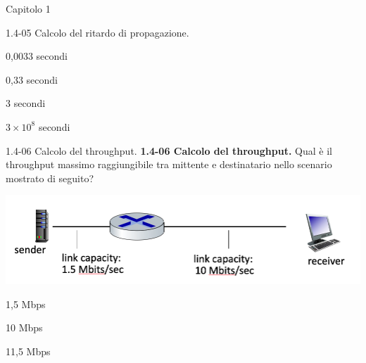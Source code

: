 \documentclass[a4paper]{article}
\begin{document}
\begin{quiz}{Capitolo 1}
\begin{multi}[points=1,shuffle=true]{1.4-05 Calcolo del ritardo di propagazione.}
\item* 0,0033 secondi
\item 0,33 secondi
\item 3 secondi
\item $3\times10^8$ secondi
\end{multi}

\begin{multi}[points=1,shuffle=true]{1.4-06 Calcolo del throughput.}
\textbf{1.4-06 Calcolo del throughput.} 
Qual è il throughput massimo raggiungibile tra mittente e destinatario nello scenario mostrato di seguito? 
\begin{center}
\includegraphics[width=.9\linewidth]{figs/1.4.6.jpg}
\end{center}
%  
\item* 1,5 Mbps
\item 10 Mbps
\item 11,5 Mbps
\end{multi}


\end{quiz}
\end{document}
